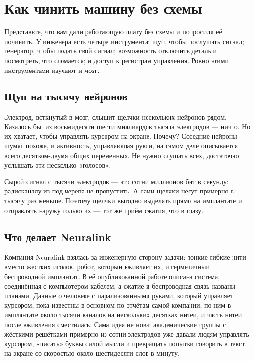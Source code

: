 \chapter{Как чинить машину без схемы}


Представьте, что вам дали работающую плату без схемы и попросили её починить. У инженера есть четыре инструмента: щуп, чтобы послушать сигнал; генератор, чтобы подать свой сигнал; возможность отключить деталь и посмотреть, что сломается; и доступ к регистрам управления. Ровно этими инструментами изучают и мозг.

\section*{Щуп на тысячу нейронов}

Электрод, воткнутый в мозг, слышит щелчки нескольких нейронов рядом. Казалось бы, из восьмидесяти шести миллиардов тысяча электродов --- ничто. Но их хватает, чтобы управлять курсором на экране. Почему? Соседние нейроны шумят похоже, и активность, управляющая рукой, на самом деле описывается всего десятком-двумя общих переменных. Не нужно слушать всех, достаточно услышать эти несколько «голосов».

Сырой сигнал с тысячи электродов --- это сотни миллионов бит в секунду: радиоканалу из-под черепа не пропустить. А сами щелчки несут примерно в тысячу раз меньше. Поэтому щелчки выгодно выделять прямо на имплантате и отправлять наружу только их --- тот же приём сжатия, что в глазу.

\section*{Что делает Neuralink}

Компания Neuralink взялась за инженерную сторону задачи: тонкие гибкие нити вместо жёстких иголок, робот, который вживляет их, и герметичный беспроводной имплантат. В её опубликованной работе описана система, соединённая с компьютером кабелем, а сжатие и беспроводная связь названы планами. Данные о человеке с парализованными руками, который управляет курсором, пока известны в основном по отчётам самой компании; по ним в имплантате около тысячи каналов на нескольких десятках нитей, и часть нитей после вживления сместилась. Сама идея не нова: академические группы с жёсткими решётками примерно из сотни электродов уже давали людям управлять курсором, «писать» буквы силой мысли и превращать попытки говорить в текст на экране со скоростью около шестидесяти слов в минуту.

